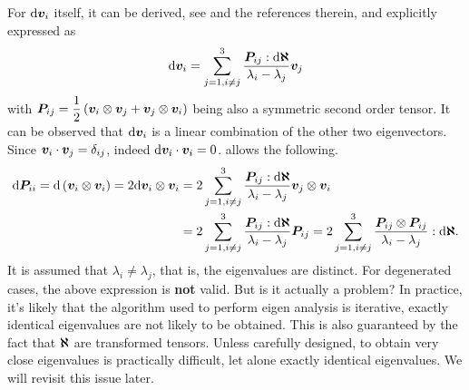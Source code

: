 For $\mathrm{d}\bm{v}_i$ itself, it can be derived, see \cite{Wu2006} and the references therein, and explicitly expressed as
\begin{gather}\label{eq:eigenvector_diff_def}
    \mathrm{d}\bm{v}_i=\sum_{j=1,i\neq{}j}^3\dfrac{\bm{P}_{ij}:\mathrm{d}\bm{\aleph}}{\lambda_i-\lambda_j}\bm{v}_j
\end{gather}
with $\bm{P}_{ij}=\dfrac{1}{2}\left(\bm{v}_i\otimes\bm{v}_j+\bm{v}_j\otimes\bm{v}_i\right)$ being also a symmetric second order tensor.
It can be observed that $ \mathrm{d}\bm{v}_i$ is a linear combination of the other two eigenvectors.
Since $\bm{v}_i\cdot\bm{v}_j=\delta_{ij}$, indeed $\mathrm{d}\bm{v}_i\cdot\bm{v}_i=0$.
 allows the following.
\begin{gather}
    \begin{split}
        \mathrm{d}\bm{P}_{ii}=\mathrm{d}\left(\bm{v}_i\otimes\bm{v}_i\right)=2\mathrm{d}\bm{v}_i\otimes\bm{v}_i & =2\sum_{j=1,i\neq{}j}^3\dfrac{\bm{P}_{ij}:\mathrm{d}\bm{\aleph}}{\lambda_i-\lambda_j}\bm{v}_j\otimes\bm{v}_i \\&=2\sum_{j=1,i\neq{}j}^3\dfrac{\bm{P}_{ij}:\mathrm{d}\bm{\aleph}}{\lambda_i-\lambda_j}\bm{P}_{ij}=2\sum_{j=1,i\neq{}j}^3\dfrac{\bm{P}_{ij}\otimes\bm{P}_{ij}}{\lambda_i-\lambda_j}:\mathrm{d}\bm{\aleph}.
    \end{split}
\end{gather}
It is assumed that $\lambda_i\neq\lambda_j$, that is, the eigenvalues are distinct.
For degenerated cases, the above expression is \textbf{not} valid.
But is it actually a problem?
In practice, it's likely that the algorithm used to perform eigen analysis is iterative, exactly identical eigenvalues are not likely to be obtained.
This is also guaranteed by the fact that $\bm{\aleph}$ are transformed tensors.
Unless carefully designed, to obtain very close eigenvalues is practically difficult, let alone exactly identical eigenvalues.
We will revisit this issue later.
